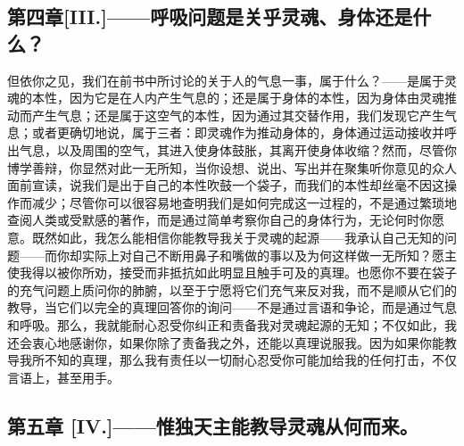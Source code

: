 
\subsection{第四章[III.]——呼吸问题是关乎灵魂、身体还是什么？}

但依你之见，我们在前书中所讨论的关于人的气息一事，属于什么？——是属于灵魂的本性，因为它是在人内产生气息的；还是属于身体的本性，因为身体由灵魂推动而产生气息；还是属于这空气的本性，因为通过其交替作用，我们发现它产生气息；或者更确切地说，属于三者：即灵魂作为推动身体的，身体通过运动接收并呼出气息，以及周围的空气，其进入使身体鼓胀，其离开使身体收缩？然而，尽管你博学善辩，你显然对此一无所知，当你设想、说出、写出并在聚集听你意见的众人面前宣读，说我们是出于自己的本性吹鼓一个袋子，而我们的本性却丝毫不因这操作而减少；尽管你可以很容易地查明我们是如何完成这一过程的，不是通过繁琐地查阅人类或受默感的著作，而是通过简单考察你自己的身体行为，无论何时你愿意。既然如此，我怎么能相信你能教导我关于灵魂的起源——我承认自己无知的问题——而你却实际上对自己不断用鼻子和嘴做的事以及为何这样做一无所知？愿主使我得以被你所劝，接受而非抵抗如此明显且触手可及的真理。也愿你不要在袋子的充气问题上质问你的肺腑，以至于宁愿将它们充气来反对我，而不是顺从它们的教导，当它们以完全的真理回答你的询问——不是通过言语和争论，而是通过气息和呼吸。那么，我就能耐心忍受你纠正和责备我对灵魂起源的无知；不仅如此，我还会衷心地感谢你，如果你除了责备我之外，还能以真理说服我。因为如果你能教导我所不知的真理，那么我有责任以一切耐心忍受你可能加给我的任何打击，不仅言语上，甚至用手。\par


\subsection{第五章 [IV.]——惟独天主能教导灵魂从何而来。}


